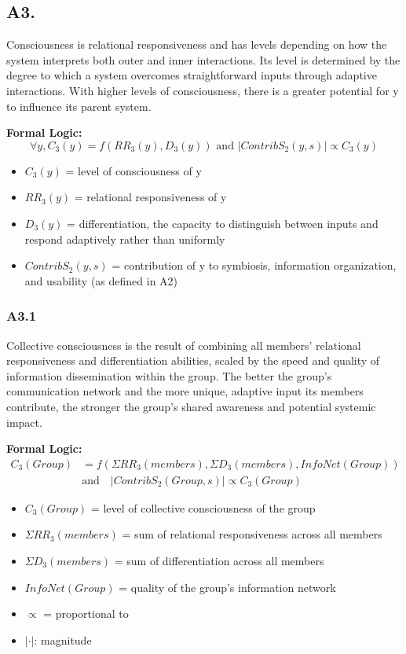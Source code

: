 \documentclass[11pt]{article}
\begin{document}
\subsection*{A3.}
Consciousness is relational responsiveness and has levels depending on how the system interprets both outer and inner interactions. Its level is determined by the degree to which a system overcomes straightforward inputs through adaptive interactions. With higher levels of consciousness, there is a greater potential for y to influence its parent system.

\textbf{Formal Logic:}
\[
\forall y, C_3(y) = f(RR_3(y), D_3(y)) \text{ and } |ContribS_2(y, s)| \propto C_3(y)
\]
\begin{itemize}
\item $C_3(y)$ = level of consciousness of y
\item $RR_3(y)$ = relational responsiveness of y
\item $D_3(y)$ = differentiation, the capacity to distinguish between inputs and respond adaptively rather than uniformly
\item $ContribS_2(y,s)$ = contribution of y to symbiosis, information organization, and usability (as defined in A2)
\end{itemize}

\subsubsection*{A3.1}
Collective consciousness is the result of combining all members’ relational responsiveness and differentiation abilities, scaled by the speed and quality of information dissemination within the group. The better the group’s communication network and the more unique, adaptive input its members contribute, the stronger the group’s shared awareness and potential systemic impact.

\textbf{Formal Logic:}
\[
\begin{aligned}
C_3(Group) &= f(\Sigma RR_3(members), \Sigma D_3(members), InfoNet(Group))\\
&\text{and} \quad |ContribS_2(Group, s)| \propto C_3(Group)
\end{aligned}
\]
\begin{itemize}
\item $C_3(Group)$ = level of collective consciousness of the group
\item $\Sigma RR_3(members)$ = sum of relational responsiveness across all members
\item $\Sigma D_3(members)$ = sum of differentiation across all members
\item $InfoNet(Group)$ = quality of the group’s information network
\item $\propto$ = proportional to
\item $|\cdot|$: magnitude
\end{itemize}
\end{document}
